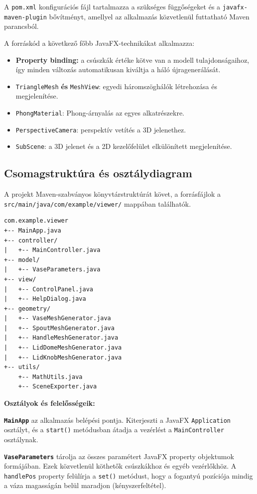 \documentclass[12pt,a4paper]{article}
\newcommand{\code}[1]{\texttt{#1}}
\begin{document}
A \code{pom.xml} konfigurációs fájl tartalmazza a szükséges függőségeket és a
\code{javafx-maven-plugin} bővítményt, amellyel az alkalmazás közvetlenül futtatható
Maven parancsból.

A forráskód a következő főbb JavaFX-technikákat alkalmazza:

\begin{itemize}
  \item \textbf{Property binding:} a csúszkák értéke kötve van a modell tulajdonságaihoz,
        így minden változás automatikusan kiváltja a háló újragenerálását.
  \item \code{TriangleMesh} \textbf{és} \code{MeshView}: egyedi háromszöghálók
        létrehozása és megjelenítése.
  \item \code{PhongMaterial}: Phong-árnyalás az egyes alkatrészekre.
  \item \code{PerspectiveCamera}: perspektív vetítés a 3D jelenethez.
  \item \code{SubScene}: a 3D jelenet és a 2D kezelőfelület elkülönített megjelenítése.
\end{itemize}

\subsection{Csomagstruktúra és osztálydiagram}

A projekt Maven-szabványos könyvtárstruktúrát követ, a forrásfájlok a
\code{src/main/java/com/example/viewer/} mappában találhatók.

\begin{lstlisting}[style=plain, caption={A projekt csomagstruktúrája}]
com.example.viewer
+-- MainApp.java
+-- controller/
|   +-- MainController.java
+-- model/
|   +-- VaseParameters.java
+-- view/
|   +-- ControlPanel.java
|   +-- HelpDialog.java
+-- geometry/
|   +-- VaseMeshGenerator.java
|   +-- SpoutMeshGenerator.java
|   +-- HandleMeshGenerator.java
|   +-- LidDomeMeshGenerator.java
|   +-- LidKnobMeshGenerator.java
+-- utils/
    +-- MathUtils.java
    +-- SceneExporter.java
\end{lstlisting}

\textbf{Osztályok és felelősségeik:}

\textbf{\code{MainApp}} az alkalmazás belépési pontja. Kiterjeszti a JavaFX
\code{Application} osztályt, és a \code{start()} metódusban átadja a vezérlést a
\code{MainController} osztálynak.

\textbf{\code{VaseParameters}} tárolja az összes paramétert JavaFX property objektumok
formájában. Ezek közvetlenül köthetők csúszkákhoz és egyéb vezérlőkhöz. A
\code{handlePos} property felülírja a \code{set()} metódust, hogy a fogantyú pozíciója
mindig a váza magasságán belül maradjon (kényszerfeltétel).
\end{document}
